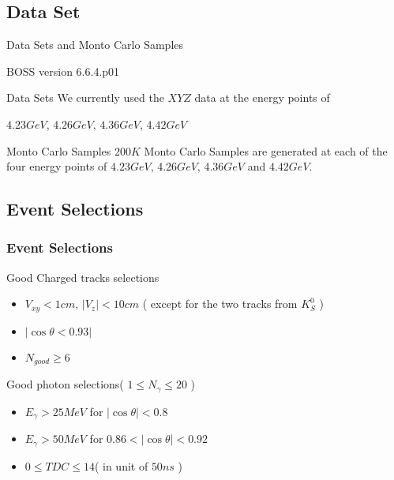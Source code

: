 \documentclass{beamer}
\begin{document}
\subsection{Data Set}
\begin{frame}{Data Sets and Monto Carlo Samples}
  \begin{block}{BOSS version}
    6.6.4.p01
  \end{block}
  \begin{block}{Data Sets}
    We currently used the $XYZ$ data at the energy points of\\
    \begin{center}
      $4.23 GeV$, $4.26 GeV$, $4.36 GeV$, $4.42 GeV$\\
    \end{center}
  \end{block}
  \begin{block}{Monto Carlo Samples}
    $200 K$ Monto Carlo Samples are generated at each of the four energy points of $4.23 GeV$, $4.26 GeV$, $4.36 GeV$ and $4.42 GeV$.
  \end{block}
\end{frame}
\subsection{Event Selections}
\begin{frame}
  \frametitle{Event Selections}
  \begin{block}{Good Charged tracks selections}
    \begin{itemize}
      \item $V_{xy} < 1 cm$, $ | V_z | < 10 cm$ ( except for the two tracks from $K_S^0$ )
      \item $|\cos\theta < 0.93 |$
      \item $N_{good}\geq 6$
    \end{itemize}
  \end{block}
  \begin{block}{Good photon selections( $1\leq N_{\gamma}\leq 20$ )}
    \begin{itemize}
      \item $E_{\gamma} > 25 MeV$ for $|\cos\theta| < 0.8$
      \item $E_{\gamma} > 50 MeV$ for $0.86<|\cos\theta|<0.92$
      \item $0\leq TDC\leq 14 $( in unit of $50ns$ )
    \end{itemize}
  \end{block}
  \bigskip
\end{frame}
\end{document}
